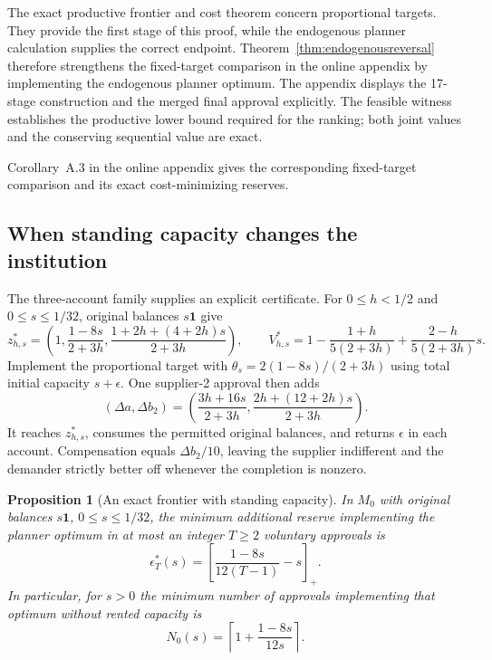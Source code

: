 \documentclass[ecta,draft]{econsocart}
\newtheorem{proposition}[theorem]{Proposition}
\theoremstyle{definition}
\theoremstyle{definition}
\begin{document}
The exact productive frontier and cost theorem concern proportional targets.
They provide the first stage of this proof, while the endogenous planner
calculation supplies the correct endpoint. Theorem~\ref{thm:endogenousreversal}
therefore strengthens the fixed-target comparison in the online appendix
by implementing the endogenous planner optimum. The appendix displays the 17-stage construction and
the merged final approval explicitly. The feasible witness establishes the productive lower bound required for
the ranking; both joint values and the conserving sequential value are exact.

Corollary~A.3%
 in the online appendix gives the
corresponding fixed-target comparison and its exact cost-minimizing reserves.

\subsection{When standing capacity changes the institution}\label{sec:standingdecisions}
The three-account family supplies an explicit certificate. For
$0\leq h<1/2$ and $0\leq s\leq1/32$, original balances $s\mathbf1$
give
\[
 z_{h,s}^*=\left(1,\frac{1-8s}{2+3h},
 \frac{1+2h+(4+2h)s}{2+3h}\right),\qquad
 V_{h,s}^*=1-\frac{1+h}{5(2+3h)}
                 +\frac{2-h}{5(2+3h)}s.
\]
Implement the proportional target with
$\theta_s=2(1-8s)/(2+3h)$ using total initial capacity
$s+\epsilon$. One supplier-2 approval then adds
\[
 (\Delta a,\Delta b_2)=
 \left(\frac{3h+16s}{2+3h},
       \frac{2h+(12+2h)s}{2+3h}\right).
\]
It reaches $z_{h,s}^*$, consumes the permitted original balances,
and returns $\epsilon$ in each account. Compensation equals
$\Delta b_2/10$, leaving the supplier indifferent and the demander
strictly better off whenever the completion is nonzero.

\begin{proposition}[An exact frontier with standing capacity]
\label{prop:standingexact}
In $M_0$ with original balances $s\mathbf1$, $0\leq s\leq1/32$,
the minimum additional reserve implementing the planner optimum in
at most an integer $T\geq2$ voluntary approvals is
\[
 \epsilon_T^*(s)=
 \left[\frac{1-8s}{12(T-1)}-s\right]_+.
\]
In particular, for $s>0$ the minimum number of approvals implementing
that optimum without rented capacity is
\[
 N_0(s)=\left\lceil1+\frac{1-8s}{12s}\right\rceil.
\]
\end{proposition}
\end{document}
